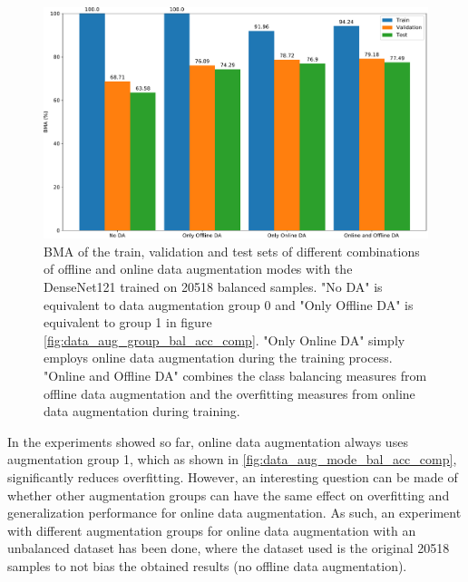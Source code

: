     \begin{figure}[ht]
        \centering
        \includegraphics[width=\textwidth]{figs/data_aug_mode_bal_acc_comp.pdf}
        \caption[\ac{BMA} of the train, validation and test sets of different combinations of offline and online data augmentation modes with a hyperparameter tuned DenseNet121 trained on 20518 balanced samples.]{\ac{BMA} of the train, validation and test sets of different combinations of offline and online data augmentation modes with the DenseNet121 trained on 20518 balanced samples. "No DA" is equivalent to data augmentation group 0 and "Only Offline DA" is equivalent to group 1 in figure \autoref{fig:data_aug_group_bal_acc_comp}. "Only Online DA" simply employs online data augmentation during the training process. "Online and Offline DA" combines the class balancing measures from offline data augmentation and the overfitting measures from online data augmentation during training. }
        \label{fig:data_aug_mode_bal_acc_comp}
    \end{figure}
    
    In the experiments showed so far, online data augmentation always uses augmentation group 1, which as shown in \autoref{fig:data_aug_mode_bal_acc_comp}, significantly reduces overfitting. However, an interesting question can be made of whether other augmentation groups can have the same effect on overfitting and generalization performance for online data augmentation. As such, an experiment with different augmentation groups for online data augmentation with an unbalanced dataset has been done, where the dataset used is the original 20518 samples to not bias the obtained results (no offline data augmentation). \par
    
